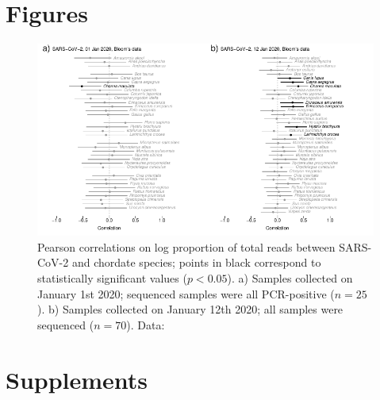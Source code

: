 \documentclass[11pt]{article}
\def \sct {\mbox{SARS-CoV-2}}
\begin{document}
\clearpage

\section*{Figures}

\begin{figure}[h!]
\includegraphics[width = \textwidth]{fig1.pdf}
\caption{Pearson correlations on log proportion of total reads between \sct{} and chordate species; points in black correspond to statistically significant values ($p < 0.05$). a) Samples collected on January 1st 2020; sequenced samples were all PCR-positive ($n = 25$). b) Samples collected on January 12th 2020; all samples were sequenced ($n = 70$). Data: \citet{Bloom2023VE}}
\label{fig:cors}
\end{figure}

\clearpage
\section*{Supplements}
\appendix 

\setcounter{table}{0}
\renewcommand{\thetable}{S\arabic{table}}

\setcounter{figure}{0}
\renewcommand{\thefigure}{S\arabic{figure}}
\end{document}
